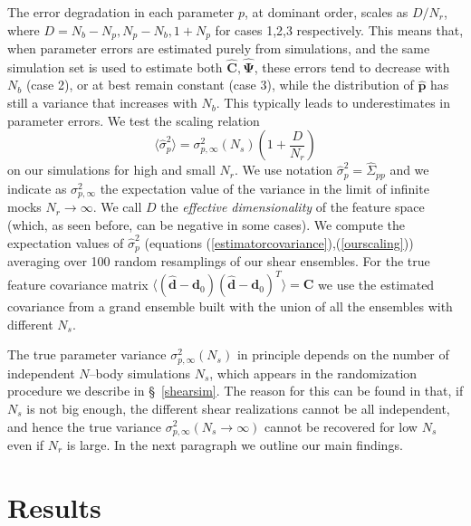 \documentclass[reprint,aps,prd,superscriptaddress,showkeys,showpacs]{revtex4-1}
\newcommand{\bb}[1]{\mathbf{#1}}
\newcommand{\bbh}[1]{\mathbf{\hat{#1}}}
\newcommand{\h}[1]{\hat{#1}}
\begin{document}
%
The error degradation  in each parameter $p$, at dominant order, scales as $D/N_r$, where $D=N_b-N_p,N_p-N_b,1+N_p$ for cases 1,2,3 respectively. This means that, when parameter errors are estimated purely from simulations, and the same simulation set is used to estimate both $\bbh{C},\bbh{\Psi}$, these errors tend to decrease with $N_b$ (case 2), or at best remain constant (case 3), while the distribution of $\bbh{p}$ has still a variance that increases with $N_b$. This typically leads to underestimates in parameter errors. We test the scaling relation
\begin{equation}
\label{ourscaling}
\langle\h{\sigma}_p^2\rangle = \sigma^2_{p,\infty}(N_s)\left(1+\frac{D}{N_r}\right)
\end{equation}
%
on our simulations for high and small $N_r$. We use notation $\h{\sigma}^2_p=\h{\Sigma}_{pp}$ and we indicate as $\sigma^2_{p,\infty}$ the expectation value of the variance in the limit of infinite mocks $N_r\rightarrow\infty$. We call $D$ the \textit{effective dimensionality} of the feature space (which, as seen before, can be negative in some cases). We compute the expectation values of $\h{\sigma}^2_p$ (equations (\ref{estimatorcovariance}),(\ref{ourscaling})) averaging over 100 random resamplings of our shear ensembles. For the true feature covariance matrix $\langle(\bbh{d}-\bb{d}_0)(\bbh{d}-\bb{d}_0)^T\rangle=\bb{C}$ we use the estimated covariance from a grand ensemble built with the union of all the ensembles with different $N_s$. 

The true parameter variance $\sigma^2_{p,\infty}(N_s)$ in principle depends on the number of independent $N$--body simulations $N_s$, which appears in the randomization procedure we describe in \S~\ref{shearsim}. The reason for this can be found in that, if $N_s$ is not big enough, the different shear realizations cannot be all independent, and hence the true variance $\sigma^2_{p,\infty}(N_s\rightarrow\infty)$ cannot be recovered for low $N_s$ even if $N_r$ is large. In the next paragraph we outline our main findings.
 


\section{Results} 

\end{document}
